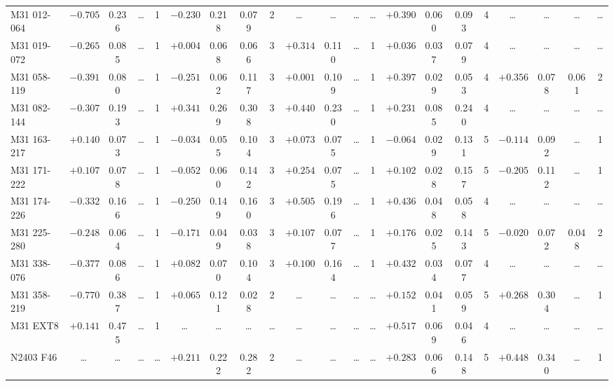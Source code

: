 \documentclass{aa}
\begin{document}
\begin{appendix}
\begin{table*}
\begin{adjustbox}{width=1\textwidth}
{\begin{tabular}{l cccccccccccccccccccc}
M31 012-064   & $-0.705$ & 0.236 & \ldots & 1 & $-0.230$ & 0.218 & 0.079 & 2 & \ldots & \ldots & \ldots & \ldots & $+0.390$ & 0.060 & 0.093 & 4 & \ldots & \ldots & \ldots & \ldots \\
M31 019-072   & $-0.265$ & 0.085 & \ldots & 1 & $+0.004$ & 0.068 & 0.066 & 3 & $+0.314$ & 0.110 & \ldots & 1 & $+0.036$ & 0.037 & 0.079 & 4 & \ldots & \ldots & \ldots & \ldots \\
M31 058-119   & $-0.391$ & 0.080 & \ldots & 1 & $-0.251$ & 0.062 & 0.117 & 3 & $+0.001$ & 0.109 & \ldots & 1 & $+0.397$ & 0.029 & 0.053 & 4 & $+0.356$ & 0.078 & 0.061 & 2 \\
M31 082-144   & $-0.307$ & 0.193 & \ldots & 1 & $+0.341$ & 0.269 & 0.308 & 3 & $+0.440$ & 0.230 & \ldots & 1 & $+0.231$ & 0.085 & 0.240 & 4 & \ldots & \ldots & \ldots & \ldots \\
M31 163-217   & $+0.140$ & 0.073 & \ldots & 1 & $-0.034$ & 0.055 & 0.104 & 3 & $+0.073$ & 0.075 & \ldots & 1 & $-0.064$ & 0.029 & 0.131 & 5 & $-0.114$ & 0.092 & \ldots & 1 \\
M31 171-222   & $+0.107$ & 0.078 & \ldots & 1 & $-0.052$ & 0.060 & 0.142 & 3 & $+0.254$ & 0.075 & \ldots & 1 & $+0.102$ & 0.028 & 0.157 & 5 & $-0.205$ & 0.112 & \ldots & 1 \\
M31 174-226   & $-0.332$ & 0.166 & \ldots & 1 & $-0.250$ & 0.149 & 0.160 & 3 & $+0.505$ & 0.196 & \ldots & 1 & $+0.436$ & 0.048 & 0.058 & 4 & \ldots & \ldots & \ldots & \ldots \\
M31 225-280   & $-0.248$ & 0.064 & \ldots & 1 & $-0.171$ & 0.049 & 0.038 & 3 & $+0.107$ & 0.077 & \ldots & 1 & $+0.176$ & 0.025 & 0.143 & 5 & $-0.020$ & 0.072 & 0.048 & 2 \\
M31 338-076   & $-0.377$ & 0.086 & \ldots & 1 & $+0.082$ & 0.070 & 0.104 & 3 & $+0.100$ & 0.164 & \ldots & 1 & $+0.432$ & 0.034 & 0.077 & 4 & \ldots & \ldots & \ldots & \ldots \\
M31 358-219   & $-0.770$ & 0.387 & \ldots & 1 & $+0.065$ & 0.121 & 0.028 & 2 & \ldots & \ldots & \ldots & \ldots & $+0.152$ & 0.041 & 0.059 & 5 & $+0.268$ & 0.304 & \ldots & 1 \\
M31 EXT8      & $+0.141$ & 0.475 & \ldots & 1 & \ldots & \ldots & \ldots & \ldots & \ldots & \ldots & \ldots & \ldots & $+0.517$ & 0.069 & 0.046 & 4 & \ldots & \ldots & \ldots & \ldots \\
N2403 F46     & \ldots & \ldots & \ldots & \ldots & $+0.211$ & 0.222 & 0.282 & 2 & \ldots & \ldots & \ldots & \ldots & $+0.283$ & 0.066 & 0.148 & 5 & $+0.448$ & 0.340 & \ldots & 1 \\
\hline
\end{tabular}
}
\end{adjustbox}
\end{table*}


\end{appendix}
\end{document}
